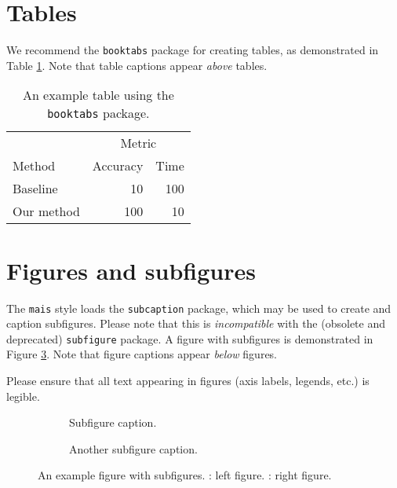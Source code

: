 \documentclass[11pt]{article}
\begin{document}
\section{Tables}

We recommend the \texttt{booktabs} package for creating tables, as demonstrated in Table \ref{example_table}. Note that table captions appear \emph{above} tables.

\begin{table}
  \caption{An example table using the \texttt{booktabs} package.}
  \label{example_table}
  \centering
  \begin{tabular}{lrr}
    \toprule
    & \multicolumn{2}{c}{Metric} \\
    \cmidrule{2-3}
    Method & Accuracy & Time \\
    \midrule
    Baseline & 10 & 100 \\
    Our method & 100 & 10 \\
    \bottomrule
  \end{tabular}
\end{table}

\section{Figures and subfigures}

The \texttt{mais} style loads the \texttt{subcaption} package, which may be used to create and caption subfigures. Please note that this is \emph{incompatible} with the (obsolete and deprecated) \texttt{subfigure} package. A figure with subfigures is demonstrated in Figure \ref{example_figure}. Note that figure captions appear \emph{below} figures.

Please ensure that all text appearing in figures (axis labels, legends, etc.) is legible.

\begin{figure}
  \begin{subfigure}[t]{0.5\linewidth}
    \centering
    \caption{Subfigure caption.}
    \label{example_figure_left}
  \end{subfigure}
  \begin{subfigure}[t]{0.5\linewidth}
    \centering
    \caption{Another subfigure caption.}
    \label{example_figure_right}
  \end{subfigure}
  \caption{An example figure with subfigures. : left figure. : right figure.}
  \label{example_figure}
\end{figure}
\end{document}
